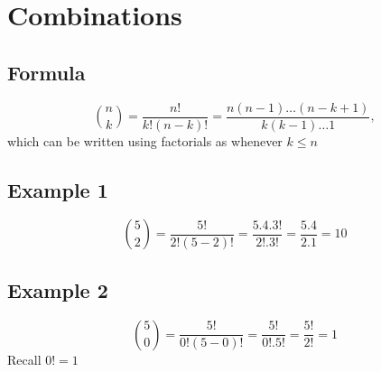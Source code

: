 \documentclass[]{article}
\begin{document}
\section*{Combinations}

\subsection*{Formula}
\[ \binom nk  = \frac{n!}{k!(n-k)!} = \frac{n(n-1)\ldots(n-k+1)}{k(k-1)\dots 1},\]
which can be written using factorials as  whenever $k\leq n$

\subsection*{Example 1}

\[ \binom 5 2  = \frac{5!}{2!(5-2)!} = \frac{5.4.3!}{2! .3!} = \frac{5.4}{2.1} = 10\]

\subsection*{Example 2}

\[ \binom 5 0  = \frac{5!}{0!(5-0)!} = \frac{5!}{0! .5!} = \frac{5!}{2!} = 1\]
Recall $0! =1$
\end{document}
